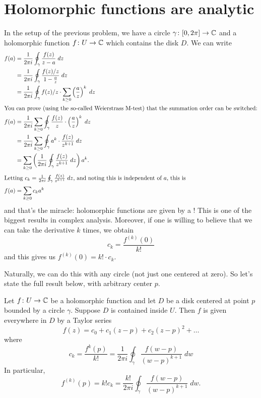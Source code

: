\section{Holomorphic functions are analytic}
In the setup of the previous problem, we have a circle $\gamma \colon [0,2\pi] \to \mathbb C$
and a holomorphic function $f \colon U \to \mathbb C$ which contains the disk $D$.
We can write
\begin{align*}
	f(a) &= \frac{1}{2\pi i} \oint_\gamma \frac{f(z)}{z-a} \; dz \\
	&= \frac{1}{2\pi i} \oint_\gamma \frac{f(z)/z}{1 - \frac az} \; dz \\
	&= \frac{1}{2\pi i} \oint_\gamma f(z)/z \cdot \sum_{k \ge 0} \left( \frac az \right)^k \; dz \\
	\intertext{You can prove (using the so-called Weierstrass M-test) that the summation order can be switched:}
	f(a) &= \frac{1}{2\pi i} \sum_{k \ge 0} \oint_\gamma \frac{f(z)}{z} \cdot \left( \frac az \right)^k \; dz \\
	&= \frac{1}{2\pi i} \sum_{k \ge 0} \oint_\gamma a^k \cdot \frac{f(z)}{z^{k+1}} \; dz \\
	&=  \sum_{k \ge 0} \left( \frac{1}{2\pi i}\oint_\gamma \frac{f(z)}{z^{k+1}} \; dz \right) a^k. \\
	\intertext{Letting
		$c_k =  \frac{1}{2\pi i}\oint_\gamma \frac{f(z)}{z^{k+1}} \; dz$,
		and noting this is independent of $a$, this is}
	f(a) &= \sum_{k \ge 0} c_k a^k
\end{align*}
and that's the miracle: holomorphic functions
are given by a !
This is one of the biggest results in complex analysis.
Moreover, if one is willing to believe that we can
take the derivative $k$ times, we obtain
\[ c_k = \frac{f^{(k)}(0)}{k!} \]
and this gives us $f^{(k)}(0) = k! \cdot c_k$.

Naturally, we can do this with any circle (not just one centered at zero).
So let's state the full result below, with arbitrary center $p$.

\begin{theorem}
	Let $f \colon U \to \mathbb C$ be a holomorphic function and let $D$ be a disk centered at point $p$
	bounded by a circle $\gamma$.  Suppose $D$ is contained inside $U$.
	Then $f$ is given everywhere in $D$ by a Taylor series
	\[
		f(z) = c_0 + c_1(z-p) + c_2(z-p)^2 + \dots
	\]
	where
	\[
		c_k = \frac{f^{k}(p)}{k!} = \frac{1}{2\pi i} \oint_\gamma \frac{f(w-p)}{(w-p)^{k+1}} \; dw
	\]
	In particular,
	\[ f^{(k)}(p) = k! c_k = \frac{k!}{2\pi i} \oint_\gamma \frac{f(w-p)}{(w-p)^{k+1}} \; dw. \]
\end{theorem}


